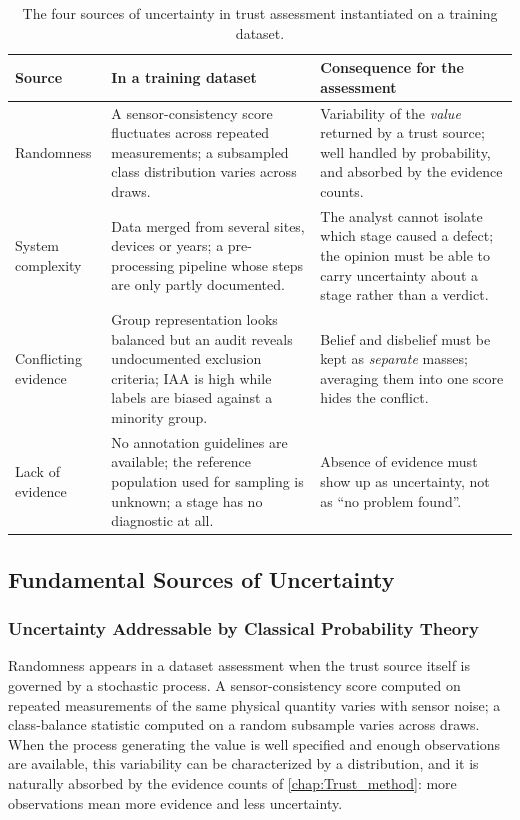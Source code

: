 \begin{table}[!htbp]
  \centering
  \small
  \renewcommand{\arraystretch}{1.2}
  \begin{tabular}{@{}p{2.6cm}p{5.4cm}p{5.4cm}@{}}
    \toprule
    \textbf{Source} & \textbf{In a training dataset} & \textbf{Consequence for the assessment} \\
    \midrule
    Randomness & A sensor-consistency score fluctuates across repeated measurements; a subsampled class distribution varies across draws. & Variability of the \emph{value} returned by a trust source; well handled by probability, and absorbed by the evidence counts. \\
    System complexity & Data merged from several sites, devices or years; a pre-processing pipeline whose steps are only partly documented. & The analyst cannot isolate which stage caused a defect; the opinion must be able to carry uncertainty about a stage rather than a verdict. \\
    Conflicting evidence & Group representation looks balanced but an audit reveals undocumented exclusion criteria; \ac{IAA} is high while labels are biased against a minority group. & Belief and disbelief must be kept as \emph{separate} masses; averaging them into one score hides the conflict. \\
    Lack of evidence & No annotation guidelines are available; the reference population used for sampling is unknown; a stage has no diagnostic at all. & Absence of evidence must show up as uncertainty, not as ``no problem found''. \\
    \bottomrule
  \end{tabular}
  \caption{The four sources of uncertainty in trust assessment instantiated on a training dataset.}
  \label{tab:dataset-trust:uncertainty-examples}
\end{table}

\subsection{Fundamental Sources of Uncertainty}
\label{sec:dataset-trust:uncertainty:sources}

\subsubsection{Uncertainty Addressable by Classical Probability Theory}
\label{sec:dataset-trust:uncertainty:probability}
Randomness appears in a dataset assessment when the trust source itself is governed by a stochastic process. A sensor-consistency score computed on repeated measurements of the same physical quantity varies with sensor noise; a class-balance statistic computed on a random subsample varies across draws. When the process generating the value is well specified and enough observations are available, this variability can be characterized by a distribution, and it is naturally absorbed by the evidence counts of \cref{chap:Trust_method}: more observations mean more evidence and less uncertainty.

